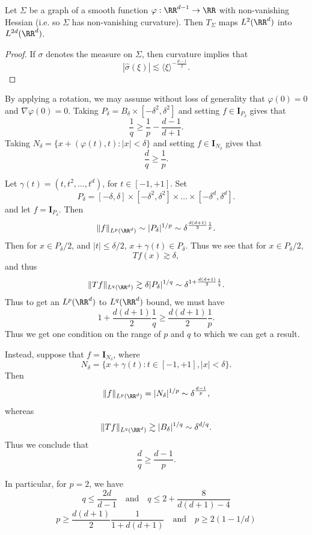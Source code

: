 \begin{theorem}
    Let $\Sigma$ be a graph of a smooth function $\varphi: \RR^{d-1} \to \RR$ with non-vanishing Hessian (i.e. so $\Sigma$ has non-vanishing curvature). Then $T_\Sigma$ maps $L^2(\RR^d)$ into $L^{2d}(\RR^d)$.
\end{theorem}
\begin{proof}
    If $\sigma$ denotes the measure on $\Sigma$, then curvature implies that
    \[ |\widehat{\sigma}(\xi)| \lesssim \langle \xi \rangle^{- \frac{d-1}{2}}. \]
\end{proof}

\begin{remark}
    By applying a rotation, we may assume without loss of generality that $\varphi(0) = 0$ and $\nabla \varphi(0) = 0$. Taking $P_\delta = B_\delta \times [-\delta^2, \delta^2]$ and setting $f \in \mathbf{I}_{P_\delta}$ gives that
    \[ \frac{1}{q} \geq \frac{1}{p} - \frac{d-1}{d+1}. \]
    Taking $N_\delta = \{ x + (\varphi(t),t) : |x| < \delta \}$ and setting $f \in \mathbf{I}_{N_\delta}$ gives that
    \[ \frac{d}{q} \geq \frac{1}{p}. \]
\end{remark}






\begin{example}
    Let $\gamma(t) = (t,t^2,\dots,t^d)$, for $t \in [-1,+1]$. Set
    \[ P_\delta = [-\delta,\delta] \times [-\delta^2,\delta^2] \times \dots \times [-\delta^d, \delta^d]. \]
    and let $f = \mathbf{I}_{P_\delta}$. Then
    \[ \| f \|_{L^p(\RR^d)} \sim |P_\delta|^{1/p} \sim \delta^{\frac{d(d+1)}{2} \frac{1}{p}}. \]
    Then for $x \in P_\delta / 2$, and $|t| \leq \delta / 2$, $x + \gamma(t) \in P_\delta$. Thus we see that for $x \in P_\delta / 2$,
    \[ Tf(x) \gtrsim \delta, \]
    and thus
    \[ \| Tf \|_{L^q(\RR^d)} \gtrsim \delta | P_\delta |^{1/q} \sim \delta^{1 + \frac{d(d+1)}{2} \frac{1}{q}}. \]
    Thus to get an $L^p(\RR^d)$ to $L^q(\RR^d)$ bound, we must have
    \[ 1 + \frac{d(d+1)}{2} \frac{1}{q} \geq \frac{d(d+1)}{2} \frac{1}{p}. \]
    Thus we get one condition on the range of $p$ and $q$ to which we can get a result.

    Instead, suppose that $f = \mathbf{I}_{N_\delta}$, where
    \[ N_\delta = \{ x + \gamma(t): t \in [-1,+1], |x| < \delta \}. \]
    Then
    \[ \| f \|_{L^p(\RR^d)} = |N_\delta|^{1/p} \sim \delta^{\frac{d-1}{p}}, \]
    whereas
    \[ \| Tf \|_{L^q(\RR^d)} \gtrsim |B_\delta|^{1/q} \sim \delta^{d/q}. \]
    Thus we conclude that
    \[ \frac{d}{q} \geq \frac{d-1}{p}. \]

    In particular, for $p = 2$, we have
    \[ q \leq \frac{2d}{d-1} \quad\text{and}\quad q \leq 2 + \frac{8}{d(d+1) - 4} \]
    \[ p \geq \frac{d(d+1)}{2} \frac{1}{1 + d(d+1)} \quad\text{and}\quad p \geq 2(1 - 1/d) \]
\end{example}












